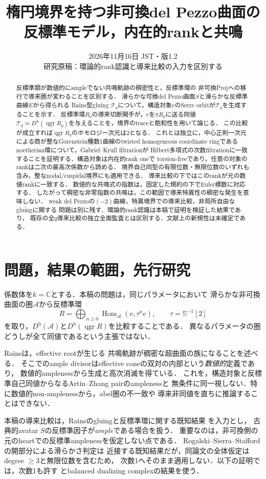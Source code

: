 \documentclass[11pt,a4paper]{ltjsarticle}
\title{楕円境界を持つ非可換del Pezzo曲面の\\反標準モデル，内在的rankと共鳴}
\author{}
\date{2026年11月16日 JST・版1.2\\研究原稿：環論的rank認識と導来比較の入力を区別する}
\theoremstyle{definition}
\newcommand{\TT}{\mathcal T}
\renewcommand{\AA}{\mathcal A}
\newcommand{\SSer}{\mathbb S}
\newcommand{\Db}{D^{\mathrm b}}
\newcommand{\Hom}{\operatorname{Hom}}
\newcommand{\qgr}{\operatorname{qgr}}
\begin{document}
\maketitle
\begin{abstract}
反標準類が数値的にampleでない共鳴軌跡の稠密性と，反標準環の
非可換Projへの移行で導来圏が変わることを区別する．
滑らかな可換del Pezzo曲面$S$と滑らかな反標準曲線$E$から得られる
Rains型gluing $\TT_q$について，構造対象$e$のSerre orbitが$\TT_q$を生成することを示す．
反標準環$R_q$の導来切断関手が，$e$を$\pi R_q$に送る同値
$\TT_q\simeq\Db(\qgr R_q)$を与えることを，境界のtraceと飽和性を用いて論じる．
この比較が成立すれば$\qgr R_q$のホモロジー次元は2となる．
これとは独立に，中心正則一次元による商が整なGorenstein種数1曲線のtwisted homogeneous
coordinate ringであるnoetherian環について，Gabriel--Krull filtrationが
Hilbert多項式の次数filtrationに一致することを証明する．構造対象は内在的rank oneで
torsion-freeであり，任意の対象のrankは二次の最高次係数から読める．
境界自己同型の有限位数・無限位数のいずれも含み，整なnodal/cuspidal境界にも適用できる．
導来比較の下ではこのrankが元の数値rankに一致する．
数値的な共鳴式の指数は，固定した規約の下でEuler標数に対応する．
したがって稠密な非零指数の共鳴は，この範囲で導来特異性の稠密な発生を意味しない．
weak del Pezzoの$(-2)$曲線，特異境界での導来比較，非局所自由なgluingに関する
問題は別に残す．環論的rank認識は本稿で証明を検証した結果であり，
既存の全$q$導来比較の独立全面監査とは区別する．文献上の新規性は未確定である．
\end{abstract}

\section{問題，結果の範囲，先行研究}
係数体を$k=\mathbb C$とする．本稿の問題は，同じパラメータにおいて
滑らかな非可換曲面の圏$\AA$から反標準環
\[
 R=\bigoplus_{n\geq0}\Hom_{\AA}(e,\tau^n e),\qquad
 \tau=\SSer^{-1}[2]
\]
を取り，$\Db(\AA)$と$\Db(\qgr R)$を比較することである．
異なるパラメータの圏どうしが全て同値であるという主張ではない．

Rains\cite[\S4, pp.~34--35]{RF}は，effective rootが生じる
共鳴軌跡が稠密な超曲面の族になることを述べる．
そこでのample divisorはeffective coneの双対の内部という\emph{数値的}定義であり，
数値的amplenessから生成と高次消滅を得ている．
これを，構造対象と反標準自己同値からなるArtin--Zhang pairのamplenessと
無条件に同一視しない．特に数値的non-amplenessから，abel圏の不一致や
導来非同値を直ちに推論することはできない．

本稿の導来比較は，Rainsのgluingと反標準環に関する既知結果
\cite[\S4, Proposition~5.1, Corollary~3.8]{RF}を入力とし，
古典的avatar $S$の反標準因子が\emph{ample}である場合を扱う．
重要なのは，非可換側の元のheartでの反標準amplenessを仮定しない点である．
Rogalski--Sierra--Stafford\cite[Lemma~6.8]{RSSDown}の開部分による滑らかさ判定は
近接する既知結果だが，同論文の全体仮定はdegree $\geq3$と無限位数を含むため，
次数1へそのまま適用しない．以下の証明では，次数1も許す
\cite[Proposition~2.4]{RSSBlow}とbalanced dualizing complexの結果\cite{YZ}を使う．
\end{document}
